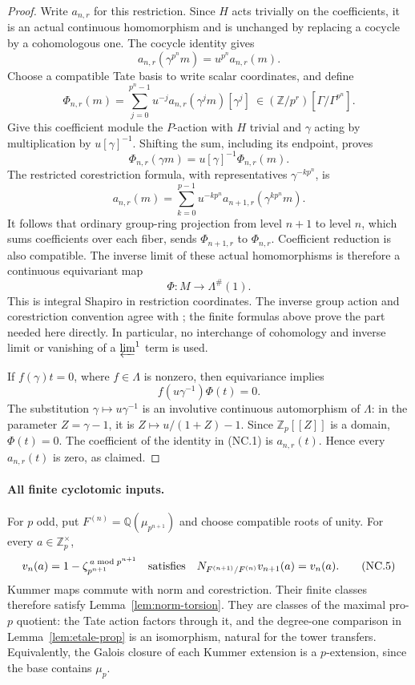 \begin{proof}
Write \(a_{n,r}\) for this restriction.  Since \(H\) acts trivially
on the coefficients, it is an actual continuous homomorphism and is
unchanged by replacing a cocycle by a cohomologous one.  The cocycle
identity gives
\[
 a_{n,r}(\gamma^{p^n}m)=u^{p^n}a_{n,r}(m).
\]
Choose a compatible Tate basis to write scalar coordinates, and define
\[
 \Phi_{n,r}(m)=
 \sum_{j=0}^{p^n-1}u^{-j}a_{n,r}(\gamma^j m)[\gamma^j]
 \ \in(\mathbb Z/p^r)[\Gamma/\Gamma^{p^n}].                 \tag{NC.1}
\]
Give this coefficient module the \(P\)-action with \(H\) trivial and
\(\gamma\) acting by multiplication by \(u[\gamma]^{-1}\).
Shifting the sum, including its endpoint, proves
\[
 \Phi_{n,r}(\gamma m)=u[\gamma]^{-1}\Phi_{n,r}(m).
                                                               \tag{NC.2}
\]
The restricted corestriction formula, with representatives
\(\gamma^{-kp^n}\), is
\[
 a_{n,r}(m)=
 \sum_{k=0}^{p-1}u^{-kp^n}a_{n+1,r}(\gamma^{kp^n}m).
                                                               \tag{NC.3}
\]
It follows that ordinary group-ring projection from level \(n+1\)
to level \(n\), which sums coefficients over each fiber, sends
\(\Phi_{n+1,r}\) to \(\Phi_{n,r}\).  Coefficient reduction is also
compatible.  The inverse limit of these actual homomorphisms is
therefore a continuous equivariant map
\[
                  \Phi:M\longrightarrow\Lambda^\#(1).     \tag{NC.4}
\]
This is integral Shapiro in restriction coordinates.  The inverse
group action and corestriction convention agree with
\cite[\S2.5, pp.~16--17]{SharifiReciprocity2017};
the finite formulas above prove the part needed here directly.
In particular, no interchange of cohomology and inverse limit or
vanishing of a \(\varprojlim^1\) term is used.

If \(f(\gamma)t=0\), where \(f\in\Lambda\) is nonzero, then
equivariance implies
\[
                   f(u\gamma^{-1})\Phi(t)=0.
\]
The substitution \(\gamma\mapsto u\gamma^{-1}\) is an involutive
continuous automorphism of \(\Lambda\): in the parameter
\(Z=\gamma-1\), it is \(Z\mapsto u/(1+Z)-1\).
Since \(\mathbb Z_p[[Z]]\) is a domain, \(\Phi(t)=0\).
The coefficient of the identity in (NC.1) is \(a_{n,r}(t)\).
Hence every \(a_{n,r}(t)\) is zero, as claimed.
\end{proof}

\paragraph{All finite cyclotomic inputs.}
For \(p\) odd, put \(F^{(n)}=\mathbb Q(\mu_{p^{n+1}})\) and choose
compatible roots of unity.  For every \(a\in\mathbb Z_p^\times\),
\[
 v_n(a)=1-\zeta_{p^{n+1}}^{\,a\bmod p^{n+1}}
 \quad\hbox{satisfies}\quad
 N_{F^{(n+1)}/F^{(n)}}v_{n+1}(a)=v_n(a).                    \tag{NC.5}
\]
Kummer maps commute with norm and corestriction.  Their finite
classes therefore satisfy Lemma~\ref{lem:norm-torsion}.
They are classes of the maximal pro-\(p\) quotient: the Tate
action factors through it, and the degree-one comparison in
Lemma~\ref{lem:etale-prop} is an isomorphism, natural for the
tower transfers.  Equivalently, the Galois closure of each Kummer
extension is a \(p\)-extension, since the base contains \(\mu_p\).

